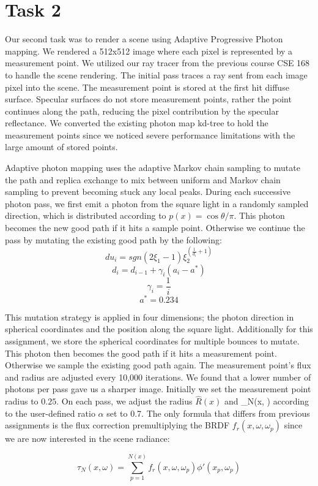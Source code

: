 \section*{Task 2}
Our second task was to render a scene using Adaptive Progressive Photon mapping. We rendered a 512x512 image where each pixel is represented by a measurement point. We utilized our ray tracer from the previous course CSE 168 to handle the scene rendering. The initial pass traces a ray sent from each image pixel into the scene. The measurement point is stored at the first hit diffuse surface. Specular surfaces do not store measurement points, rather the point continues along the path, reducing the pixel contribution by the specular reflectance. We converted the existing photon map kd-tree to hold the measurement points since we noticed severe performance limitations with the large amount of stored points. 

Adaptive photon mapping uses the adaptive Markov chain sampling to mutate the path and replica exchange to mix between uniform and Markov chain sampling to prevent becoming stuck any local peaks. During each successive photon pass, we first emit a photon from the square light in a randomly sampled direction, which is distributed according to $p(x)=\cos \theta/\pi$. This photon becomes the new good path if it hits a sample point. Otherwise we continue the pass by mutating the existing good path by the following:
$$du_i = sgn(2\xi_1 - 1)\xi_2^{(\frac{1}{d_i}+1)}$$
$$d_i = d_{i-1} + \gamma_i(a_i - a^*)$$
$$\gamma_i = \frac{1}{i}$$
$$a^* = 0.234$$

This mutation strategy is applied in four dimensions; the photon direction in spherical coordinates and the position along the square light. Additionally for this assignment, we store the spherical coordinates for multiple bounces to mutate. This photon then becomes the good path if it hits a measurement point. Otherwise we sample the existing good path again. The measurement point's flux and radius are adjusted every 10,000 iterations. We found that a lower number of photons per pass gave us a sharper image. Initially we set the measurement point radius to $0.25$. On each pass, we adjust the radius $ \hat{R}(x) $ and \tau_N(x, \omega) according to the user-defined ratio $ \alpha $ set to 0.7. The only formula that differs from previous assignments is the flux correction premultiplying the BRDF $f_r(x,\omega,\omega_p)$ since we are now interested in the scene radiance:

$$ \tau_N(x, \omega) = \sum_{p=1}^{N(x)} f_r(x,\omega,\omega_p){\phi}'(x_p, \omega_p) $$


